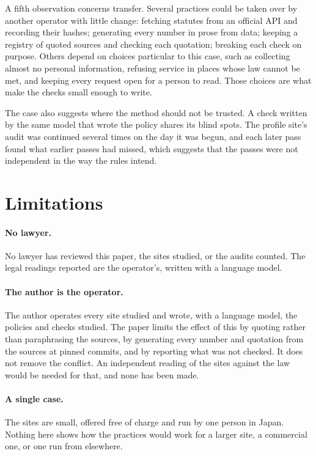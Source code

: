 \documentclass[11pt]{article}
\begin{document}
A fifth observation concerns transfer. Several practices could be taken over by another operator with little change: fetching statutes from an official API and recording their hashes; generating every number in prose from data; keeping a registry of quoted sources and checking each quotation; breaking each check on purpose. Others depend on choices particular to this case, such as collecting almost no personal information, refusing service in places whose law cannot be met, and keeping every request open for a person to read. Those choices are what make the checks small enough to write.

The case also suggests where the method should not be trusted. A check written by the same model that wrote the policy shares its blind spots. The profile site's audit was continued several times on the day it was begun, and each later pass found what earlier passes had missed, which suggests that the passes were not independent in the way the rules intend.

\section{Limitations}\label{sec:limits}

\paragraph{No lawyer.} No lawyer has reviewed this paper, the sites studied, or the audits counted. The legal readings reported are the operator's, written with a language model.

\paragraph{The author is the operator.} The author operates every site studied and wrote, with a language model, the policies and checks studied. The paper limits the effect of this by quoting rather than paraphrasing the sources, by generating every number and quotation from the sources at pinned commits, and by reporting what was not checked. It does not remove the conflict. An independent reading of the sites against the law would be needed for that, and none has been made.

\paragraph{A single case.} The sites are small, offered free of charge and run by one person in Japan. Nothing here shows how the practices would work for a larger site, a commercial one, or one run from elsewhere.
\end{document}
